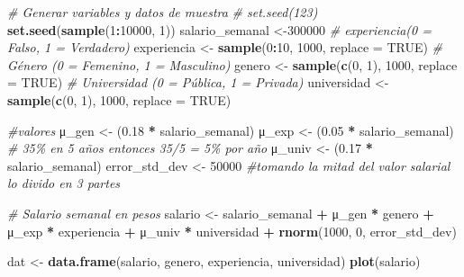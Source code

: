 \documentclass[
]{article}
\newenvironment{Shaded}{\begin{snugshade}}{\end{snugshade}}
\newcommand{\AttributeTok}[1]{\textcolor[rgb]{0.13,0.29,0.53}{#1}}
\newcommand{\CommentTok}[1]{\textcolor[rgb]{0.56,0.35,0.01}{\textit{#1}}}
\newcommand{\ConstantTok}[1]{\textcolor[rgb]{0.56,0.35,0.01}{#1}}
\newcommand{\DecValTok}[1]{\textcolor[rgb]{0.00,0.00,0.81}{#1}}
\newcommand{\FloatTok}[1]{\textcolor[rgb]{0.00,0.00,0.81}{#1}}
\newcommand{\FunctionTok}[1]{\textcolor[rgb]{0.13,0.29,0.53}{\textbf{#1}}}
\newcommand{\NormalTok}[1]{#1}
\newcommand{\OtherTok}[1]{\textcolor[rgb]{0.56,0.35,0.01}{#1}}
\newcommand{\SpecialCharTok}[1]{\textcolor[rgb]{0.81,0.36,0.00}{\textbf{#1}}}
\begin{document}
\begin{Shaded}
\begin{Highlighting}[]
\CommentTok{\# Generar variables y datos de muestra}
\CommentTok{\# set.seed(123)}
\FunctionTok{set.seed}\NormalTok{(}\FunctionTok{sample}\NormalTok{(}\DecValTok{1}\SpecialCharTok{:}\DecValTok{10000}\NormalTok{, }\DecValTok{1}\NormalTok{))}
\NormalTok{salario\_semanal }\OtherTok{\textless{}{-}}\DecValTok{300000} 
\CommentTok{\# experiencia(0 = Falso, 1 = Verdadero)}
\NormalTok{experiencia }\OtherTok{\textless{}{-}} \FunctionTok{sample}\NormalTok{(}\DecValTok{0}\SpecialCharTok{:}\DecValTok{10}\NormalTok{, }\DecValTok{1000}\NormalTok{, }\AttributeTok{replace =} \ConstantTok{TRUE}\NormalTok{)}
\CommentTok{\# Género (0 = Femenino, 1 = Masculino)}
\NormalTok{genero }\OtherTok{\textless{}{-}} \FunctionTok{sample}\NormalTok{(}\FunctionTok{c}\NormalTok{(}\DecValTok{0}\NormalTok{, }\DecValTok{1}\NormalTok{), }\DecValTok{1000}\NormalTok{, }\AttributeTok{replace =} \ConstantTok{TRUE}\NormalTok{)}
\CommentTok{\# Universidad (0 = Pública, 1 =  Privada)}
\NormalTok{universidad }\OtherTok{\textless{}{-}} \FunctionTok{sample}\NormalTok{(}\FunctionTok{c}\NormalTok{(}\DecValTok{0}\NormalTok{, }\DecValTok{1}\NormalTok{), }\DecValTok{1000}\NormalTok{, }\AttributeTok{replace =} \ConstantTok{TRUE}\NormalTok{)}

\CommentTok{\#valores}
\NormalTok{μ\_gen }\OtherTok{\textless{}{-}}\NormalTok{ (}\FloatTok{0.18} \SpecialCharTok{*}\NormalTok{ salario\_semanal)}
\NormalTok{μ\_exp }\OtherTok{\textless{}{-}}\NormalTok{ (}\FloatTok{0.05} \SpecialCharTok{*}\NormalTok{ salario\_semanal) }\CommentTok{\# 35\% en 5 años entonces 35/5 = 5\% por año}
\NormalTok{μ\_univ }\OtherTok{\textless{}{-}}\NormalTok{ (}\FloatTok{0.17} \SpecialCharTok{*}\NormalTok{ salario\_semanal)}
\NormalTok{error\_std\_dev }\OtherTok{\textless{}{-}} \DecValTok{50000} \CommentTok{\#tomando la mitad del valor salarial lo divido en 3 partes}

\CommentTok{\# Salario semanal en pesos}
\NormalTok{salario }\OtherTok{\textless{}{-}}\NormalTok{ salario\_semanal }\SpecialCharTok{+}\NormalTok{ μ\_gen }\SpecialCharTok{*}\NormalTok{ genero }\SpecialCharTok{+}\NormalTok{ μ\_exp }\SpecialCharTok{*}\NormalTok{ experiencia }\SpecialCharTok{+}\NormalTok{ μ\_univ }\SpecialCharTok{*}\NormalTok{ universidad }\SpecialCharTok{+} \FunctionTok{rnorm}\NormalTok{(}\DecValTok{1000}\NormalTok{, }\DecValTok{0}\NormalTok{, error\_std\_dev)}

\NormalTok{dat }\OtherTok{\textless{}{-}} \FunctionTok{data.frame}\NormalTok{(salario, genero, experiencia, universidad)}
\FunctionTok{plot}\NormalTok{(salario)}
\end{Highlighting}
\end{Shaded}
\end{document}
